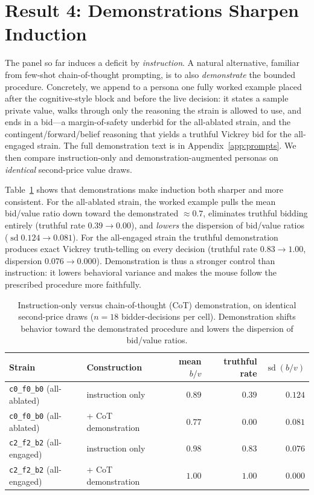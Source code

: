 \documentclass[12pt]{article}
\begin{document}
\section{Result 4: Demonstrations Sharpen Induction}
\label{sec:cot}

The panel so far induces a deficit by \emph{instruction}. A natural alternative,
familiar from few-shot chain-of-thought prompting, is to also \emph{demonstrate}
the bounded procedure. Concretely, we append to a persona one fully worked example
placed after the cognitive-style block and before the live decision: it states a
sample private value, walks through only the reasoning the strain is allowed to use,
and ends in a bid---a margin-of-safety underbid for the all-ablated strain, and the
contingent/forward/belief reasoning that yields a truthful Vickrey bid for the
all-engaged strain. The full demonstration text is in Appendix~\ref{app:prompts}.
We then compare instruction-only and demonstration-augmented personas on
\emph{identical} second-price value draws.

Table~\ref{tab:cot} shows that demonstrations make induction both sharper and more
consistent. For the all-ablated strain, the worked example pulls the mean bid/value
ratio down toward the demonstrated $\approx0.7$, eliminates truthful bidding
entirely (truthful rate $0.39\to0.00$), and \emph{lowers} the dispersion of
bid/value ratios ($\operatorname{sd}0.124\to0.081$). For the all-engaged strain the
truthful demonstration produces exact Vickrey truth-telling on every decision
(truthful rate $0.83\to1.00$, dispersion $0.076\to0.000$). Demonstration is thus a
stronger control than instruction: it lowers behavioral variance and makes the
mouse follow the prescribed procedure more faithfully.

\begin{table}[t]
\centering
\caption{Instruction-only versus chain-of-thought (CoT) demonstration, on identical
second-price draws ($n=18$ bidder-decisions per cell). Demonstration shifts
behavior toward the demonstrated procedure and lowers the dispersion of bid/value
ratios.}
\label{tab:cot}
\small
\setlength{\tabcolsep}{6pt}
\begin{tabular}{@{}llrrr@{}}
\toprule
Strain & Construction & mean $b/v$ & truthful rate & $\operatorname{sd}(b/v)$ \\
\midrule
\texttt{c0\_f0\_b0} (all-ablated)  & instruction only     & $0.89$ & $0.39$ & $0.124$ \\
\texttt{c0\_f0\_b0} (all-ablated)  & + CoT demonstration  & $0.77$ & $0.00$ & $0.081$ \\
\addlinespace
\texttt{c2\_f2\_b2} (all-engaged) & instruction only     & $0.98$ & $0.83$ & $0.076$ \\
\texttt{c2\_f2\_b2} (all-engaged) & + CoT demonstration  & $1.00$ & $1.00$ & $0.000$ \\
\bottomrule
\end{tabular}
\end{table}
\end{document}

